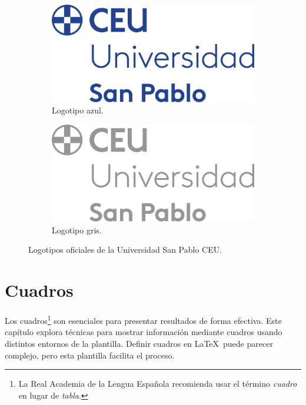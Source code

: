 \begin{figure}[!htpb]
    \centering
    \begin{subfigure}{0.45\textwidth}
        \centering
        \includegraphics[width=\textwidth]{Img/Theme/Logotypes/Logo-uspceu.pdf}
        \caption{Logotipo azul.}
        \label{fig:figure-02.1}
    \end{subfigure}
    \hspace{.5cm} %
    \begin{subfigure}{0.45\textwidth}
        \centering
        \includegraphics[width=\textwidth]{Img/Theme/Logotypes/Logo-uspceu-gris.pdf}
        \caption{Logotipo gris.}
        \label{fig:figure-02.2}
    \end{subfigure}
    \caption{Logotipos oficiales de la Universidad San Pablo CEU.}
    \label{fig:figure-02}
\end{figure}

\section{Cuadros}

Los cuadros\footnote{La Real Academia de la Lengua Española recomienda usar el término \emph{cuadro} en lugar de \emph{tabla}.} son esenciales para presentar resultados de forma efectiva. Este capítulo explora técnicas para mostrar información mediante cuadros usando distintos entornos de la plantilla. Definir cuadros en \LaTeX\ puede parecer complejo, pero esta plantilla facilita el proceso.


